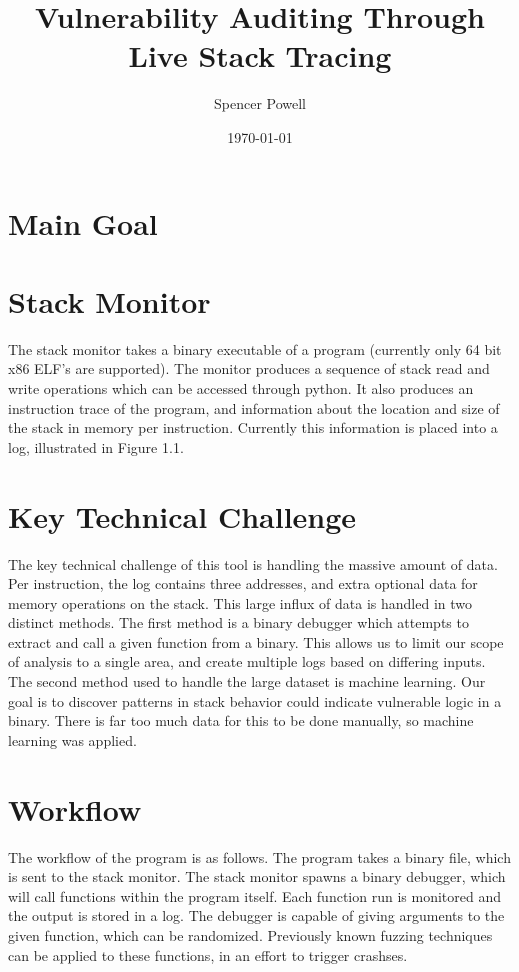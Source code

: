 \documentclass{article}
\title{Vulnerability Auditing Through Live Stack Tracing}
\author{Spencer Powell}
\date{\today}
\begin{document}
\maketitle

\section{Main Goal}

\section{Stack Monitor}

The stack monitor takes a binary executable of a program (currently only 64 bit x86 ELF's are supported). The monitor produces a sequence of stack read and write operations which can be accessed through python. It also produces an instruction trace of the program, and information about the location and size of the stack in memory per instruction. Currently this information is placed into a log, illustrated in Figure 1.1.

\section{Key Technical Challenge}

The key technical challenge of this tool is handling the massive amount of data. Per instruction, the log contains three addresses, and extra optional data for memory operations on the stack. This large influx of data is handled in two distinct methods. The first method is a binary debugger which attempts to extract and call a given function from a binary. This allows us to limit our scope of analysis to a single area, and create multiple logs based on differing inputs. The second method used to handle the large dataset is machine learning. Our goal is to discover patterns in stack behavior could indicate vulnerable logic in a binary. There is far too much data for this to be done manually, so machine learning was applied.

\section{Workflow}

The workflow of the program is as follows. The program takes a binary file, which is sent to the stack monitor. The stack monitor spawns a binary debugger, which will call functions within the program itself. Each function run is monitored and the output is stored in a log. The debugger is capable of giving arguments to the given function, which can be randomized. Previously known fuzzing techniques can be applied to these functions, in an effort to trigger crashses.
\end{document}

